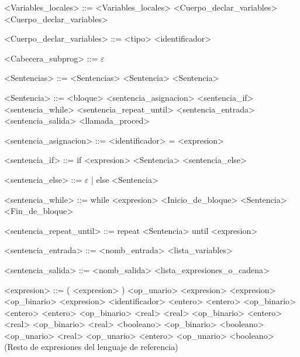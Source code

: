 \documentclass{scrartcl}
\begin{document}
\begin{grammar}
<Variables_locales> ::= <Variables_locales> <Cuerpo_declar_variables>
\alt <Cuerpo_declar_variables>

<Cuerpo_declar_variables> ::= <tipo> <identificador> %

<Cabecera_subprog> ::= $\varepsilon$

<Sentencias> ::= <Sentencias> <Sentencia>
\alt <Sentencia>

<Sentencia> ::= <bloque>
\alt <sentencia_asignacion>
\alt <sentencia_if>
\alt <sentencia_while>
\alt <sentencia_repeat_until>
\alt <sentencia_entrada>
\alt <sentencia_salida>
\alt <llamada_proced>

<sentencia_asignacion> ::=  <identificador> = <expresion>

<sentencia_if> ::= if <expresion>
 <Sentencia> <sentencia_else>

 <sentencia_else> ::= $\varepsilon$ | else <Sentencia>

<sentencia_while> ::= while <expresion> <Inicio_de_bloque>
<Sentencia>
<Fin_de_bloque>

<sentencia_repeat_until> ::= repeat <Sentencia> until <expresion>

<sentencia_entrada> ::= <nomb_entrada> <lista_variables>

<sentencia_salida> ::= <nomb_salida> <lista_expresiones_o_cadena>

<expresion> ::= ( <expresion> )
\alt <op_unario> <expresion>
\alt <expresion> <op_binario> <expresion>
\alt <identificador>
\alt <entero> %
\alt <entero> <op_binario> <entero>
\alt <entero> <op_binario> <real>
\alt <real> <op_binario> <entero>
\alt <real> <op_binario> <real>
\alt <booleano> <op_binario> <booleano>
\alt <op_unario> <real>
\alt <op_unario> <entero>
\alt <op_unario> <booleano>
\alt (Resto de expresiones del lenguaje de referencia)


\end{grammar}
\end{document}

